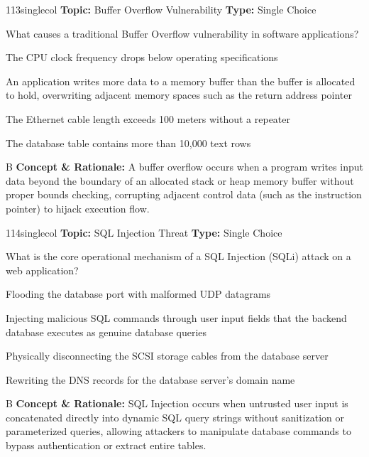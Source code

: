 \begin{qcard}{113}{singlecol}
\textcolor{darkslate!75}{\small\textbf{Topic:} Buffer Overflow Vulnerability \hfill \textbf{Type:} Single Choice}\vspace{0.4em}\par
What causes a traditional Buffer Overflow vulnerability in software applications?
\begin{qoptions}
\item The CPU clock frequency drops below operating specifications
\item An application writes more data to a memory buffer than the buffer is allocated to hold, overwriting adjacent memory spaces such as the return address pointer
\item The Ethernet cable length exceeds 100 meters without a repeater
\item The database table contains more than 10,000 text rows
\end{qoptions}
\end{qcard}
\nopagebreak
\begin{explainbox}{B}
\textbf{Concept \& Rationale:} A buffer overflow occurs when a program writes input data beyond the boundary of an allocated stack or heap memory buffer without proper bounds checking, corrupting adjacent control data (such as the instruction pointer) to hijack execution flow.
\end{explainbox}

\begin{qcard}{114}{singlecol}
\textcolor{darkslate!75}{\small\textbf{Topic:} SQL Injection Threat \hfill \textbf{Type:} Single Choice}\vspace{0.4em}\par
What is the core operational mechanism of a SQL Injection (SQLi) attack on a web application?
\begin{qoptions}
\item Flooding the database port with malformed UDP datagrams
\item Injecting malicious SQL commands through user input fields that the backend database executes as genuine database queries
\item Physically disconnecting the SCSI storage cables from the database server
\item Rewriting the DNS records for the database server's domain name
\end{qoptions}
\end{qcard}
\nopagebreak
\begin{explainbox}{B}
\textbf{Concept \& Rationale:} SQL Injection occurs when untrusted user input is concatenated directly into dynamic SQL query strings without sanitization or parameterized queries, allowing attackers to manipulate database commands to bypass authentication or extract entire tables.
\end{explainbox}

